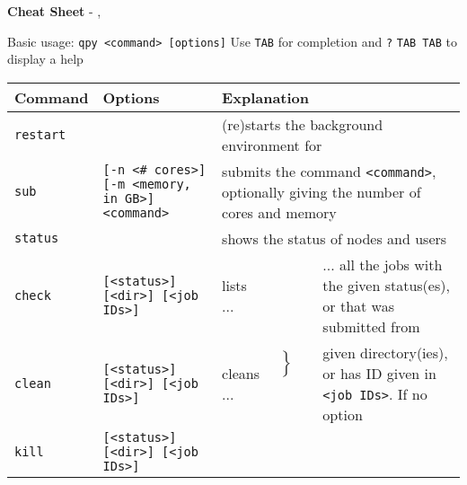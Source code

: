 \documentclass[a4paper,11pt]{article}
\begin{document}
\begin{landscape}

  \colorbox{RC2}{\textbf{\Huge Cheat Sheet}} \: {\Huge \qpy{}} \: \qpyFull{} - \qpyVersion{}, \qpyYear{}\vspace{0.0cm}

  \begin{center}
    \colorbox{RC2}{Basic usage:} {\texttt{qpy <command> [options]}} \colorbox{RC1}{Use \texttt{TAB} for completion and \texttt{?} \texttt{TAB TAB} to display a help}
  \end{center}\vspace{0.0cm}
  
  \begin{minipage}{1.0\textheight}
    \begin{tabular}{lllll}
      \hline
      \rowcolor{RC2}
      Command            & Options & \multicolumn{3}{l}{Explanation} \\
      \hline
      \texttt{restart}   &
                                   & \multicolumn{3}{l}{(re)starts the background environment for \qpy{}} \\
      \rowcolor{RC1}
      \texttt{sub}       & \texttt{[-n <\# cores>]} \texttt{[-m <memory, in GB>]} \texttt{<command>}
                                   & \multicolumn{3}{l}{submits the command \texttt{<command>}, optionally giving the number of cores and memory}\\
      \texttt{status}    &
                                   & \multicolumn{3}{l}{shows the status of nodes and users}\\
      \cellcolor{RC1}\texttt{check} & \cellcolor{RC1}\texttt{[<status>] [<dir>] [<job IDs>]}
                                   & \cellcolor{RC1}lists ... & \multirow{3}{0.3cm}{$\left\}\begin{array}{l} \\ \\ \\ \end{array}\right.$}
                                   & \cellcolor{RC1}... all the jobs with the given status(es), or that was submitted from\\
      \texttt{clean}     & \texttt{[<status>] [<dir>] [<job IDs>]}
                                   & cleans ... &
                                   & \cellcolor{RC1}given directory(ies), or has ID given in \texttt{<job IDs>}. If no option\\
      \cellcolor{RC1}\texttt{kill} & \cellcolor{RC1}\texttt{[<status>] [<dir>] [<job IDs>]}

\end{tabular}
\end{minipage}
\end{landscape}
\end{document}
